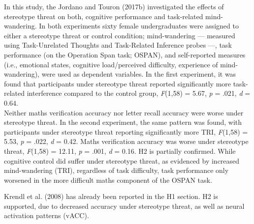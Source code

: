 \documentclass[
  stu, a4paper,floatsintext]{apa7}
\begin{document}
In this study, the Jordano and Touron (2017b) investigated the effects of stereotype threat on both, cognitive performance and task-related mind-wandering.
In both experiments sixty female undergraduates were assigned to either a stereotype threat or control condition; mind-wandering --- measured using Task-Unrelated Thoughts and Task-Related Inference probes ---, task performance (on the Operation Span task; OSPAN), and self-reported measures (i.e., emotional states, cognitive load/perceived difficulty, experience of mind-wandering), were used as dependent variables.
In the first experiment, it was found that participants under stereotype threat reported significantly more task-related interference compared to the control group, \emph{F}(1,58) = 5.67, \emph{p} = .021, \emph{d} = 0.64.\\
Neither maths verification accuracy nor letter recall accuracy were worse under stereotype threat.
In the second experiment, the same pattern was found, with participants under stereotype threat reporting significantly more TRI, \emph{F}(1,58) = 5.53, \emph{p} = .022, \emph{d} = 0.42.
Maths verification accuracy was worse under stereotype threat, \emph{F}(1,58) = 12.11, \emph{p} = .001, \emph{d} = 0.16.
H2 is partially confirmed. While cognitive control did suffer under stereotype threat, as evidenced by increased mind-wandering (TRI), regardless of task difficulty, task performance only worsened in the more difficult maths component of the OSPAN task.

Krendl et al. (2008) has already been reported in the H1 section.
H2 is supported, due to decreased accuracy under stereotype threat, as well as neural activation patterns (vACC).
\end{document}
